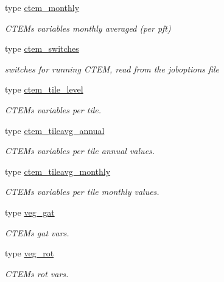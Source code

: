 \begin{DoxyCompactItemize}
type \hyperlink{structctem__statevars_1_1ctem__monthly}{ctem\+\_\+monthly}
\begin{DoxyCompactList}\small\item\em C\+T\+E\+M\textquotesingle{}s variables monthly averaged (per pft) \end{DoxyCompactList}\item 
type \hyperlink{structctem__statevars_1_1ctem__switches}{ctem\+\_\+switches}
\begin{DoxyCompactList}\small\item\em switches for running C\+T\+E\+M, read from the joboptions file \end{DoxyCompactList}\item 
type \hyperlink{structctem__statevars_1_1ctem__tile__level}{ctem\+\_\+tile\+\_\+level}
\begin{DoxyCompactList}\small\item\em C\+T\+E\+M\textquotesingle{}s variables per tile. \end{DoxyCompactList}\item 
type \hyperlink{structctem__statevars_1_1ctem__tileavg__annual}{ctem\+\_\+tileavg\+\_\+annual}
\begin{DoxyCompactList}\small\item\em C\+T\+E\+M\textquotesingle{}s variables per tile annual values. \end{DoxyCompactList}\item 
type \hyperlink{structctem__statevars_1_1ctem__tileavg__monthly}{ctem\+\_\+tileavg\+\_\+monthly}
\begin{DoxyCompactList}\small\item\em C\+T\+E\+M\textquotesingle{}s variables per tile monthly values. \end{DoxyCompactList}\item 
type \hyperlink{structctem__statevars_1_1veg__gat}{veg\+\_\+gat}
\begin{DoxyCompactList}\small\item\em C\+T\+E\+M\textquotesingle{}s \textquotesingle{}gat\textquotesingle{} vars. \end{DoxyCompactList}\item 
type \hyperlink{structctem__statevars_1_1veg__rot}{veg\+\_\+rot}
\begin{DoxyCompactList}\small\item\em C\+T\+E\+M\textquotesingle{}s \textquotesingle{}rot\textquotesingle{} vars. \end{DoxyCompactList}\end{DoxyCompactItemize}
